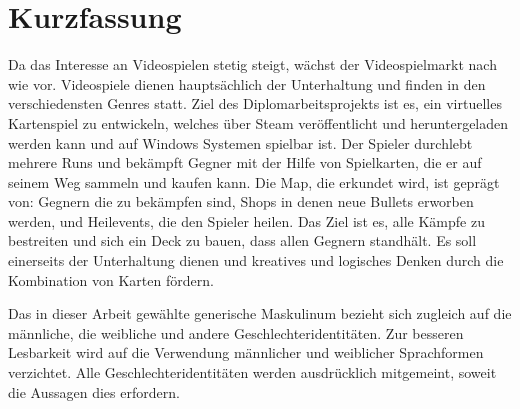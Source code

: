 \chapter*{Kurzfassung}
Da das Interesse an Videospielen stetig steigt, wächst der Videospielmarkt nach wie vor. Videospiele dienen hauptsächlich der Unterhaltung  und finden in den verschiedensten Genres statt.
Ziel des Diplomarbeitsprojekts ist es, ein virtuelles Kartenspiel zu entwickeln, welches über Steam veröffentlicht und heruntergeladen werden kann und auf Windows Systemen spielbar ist. Der Spieler durchlebt mehrere Runs und bekämpft Gegner mit der Hilfe von Spielkarten, die er auf seinem Weg sammeln und kaufen kann. Die Map, die erkundet wird, ist geprägt von: Gegnern die zu bekämpfen sind, Shops in denen neue Bullets erworben werden, und Heilevents, die den Spieler heilen. Das Ziel ist es, alle Kämpfe zu bestreiten und sich ein Deck zu bauen, dass allen Gegnern standhält.
Es soll einerseits der Unterhaltung dienen und kreatives und logisches Denken durch die Kombination von Karten fördern.
%

Das in dieser Arbeit gewählte generische Maskulinum bezieht sich zugleich auf die männliche, die weibliche und andere
Geschlechteridentitäten. Zur besseren Lesbarkeit wird auf die Verwendung männlicher und weiblicher Sprachformen verzichtet.
Alle Geschlechteridentitäten werden ausdrücklich mitgemeint, soweit die Aussagen dies erfordern.



